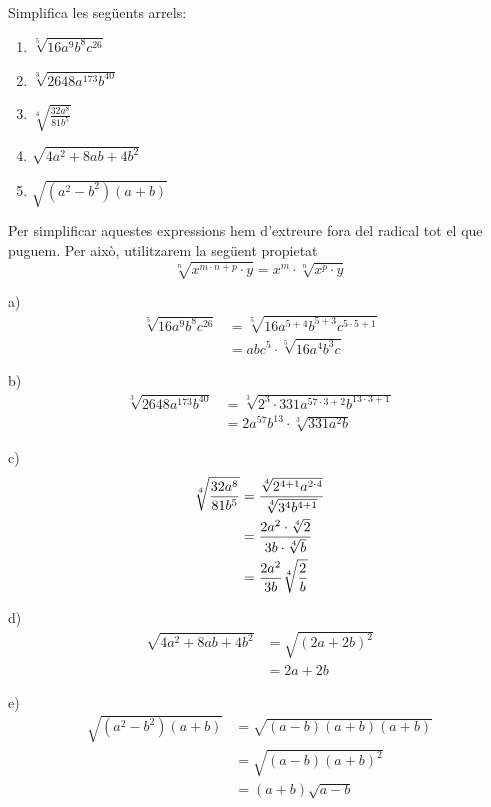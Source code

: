 \begin{exercici}
Simplifica les següents arrels:

\begin{enumerate}
\item[a)] $\sqrt[5]{16a^{9}b^{8}c^{26}}$

\item[b)] $\sqrt[3]{2648a^{173}b^{40}}$

\item[c)] $\sqrt[4]{\frac{32a^{8}}{81b^{5}}}$

\item[d)] $\sqrt{4a^{2}+8ab+4b^{2}}$

\item[e)] $\sqrt{(a^{2}-b^{2})(a+b)}$
\end{enumerate}

\end{exercici}

\begin{solucio}
Per simplificar aquestes expressions hem d’extreure fora del radical tot el
que puguem. Per això, utilitzarem la següent propietat%
\begin{equation*}
\sqrt[n]{x^{m\cdot n+p}\cdot y}=x^{m}\cdot \sqrt[n]{x^{p}\cdot y}
\end{equation*}

a)%
\begin{align*}
\sqrt[5]{16a^{9}b^{8}c^{26}} &=\sqrt[5]{16a^{5+4}b^{5+3}c^{5\cdot 5+1}} \\
&=abc^{5}\cdot \sqrt[5]{16a^{4}b^{3}c}
\end{align*}

b)%
\begin{align*}
\sqrt[3]{2648a^{173}b^{40}} &=\sqrt[3]{2^{3}\cdot 331a^{57\cdot
3+2}b^{13\cdot 3+1}} \\
&=2a^{57}b^{13}\cdot \sqrt[3]{331a^{2}b}
\end{align*}

c)%
\begin{align*}
\sqrt[4]{\frac{32a^{8}}{81b^{5}}} &=\frac{\sqrt[4]{2^{4+1}a^{2\cdot 4}}}{%
\sqrt[4]{3^{4}b^{4+1}}} \\
&=\frac{2a^{2}\cdot \sqrt[4]{2}}{3b\cdot \sqrt[4]{b}} \\
&=\frac{2a^{2}}{3b}\sqrt[4]{\frac{2}{b}}
\end{align*}

d)%
\begin{align*}
\sqrt{4a^{2}+8ab+4b^{2}} &=\sqrt{(2a+2b)^{2}} \\
&=2a+2b
\end{align*}

e)%
\begin{align*}
\sqrt{(a^{2}-b^{2})(a+b)} &=\sqrt{(a-b)(a+b)(a+b)} \\
&=\sqrt{(a-b)(a+b)^{2}} \\
&=(a+b)\sqrt{a-b}
\end{align*}
\end{solucio}

